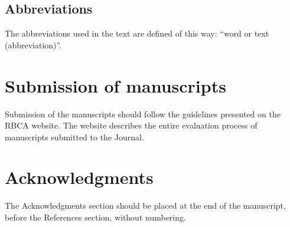 \documentclass[alpha-refs,brazilian]{RBCA_v3.0}
\begin{document}
\subsection{Abbreviations}
The abbreviations used in the text are defined of this way: ``word or text (abbreviation)''.


\section{Submission of manuscripts}
Submission of the manuscripts should follow the guidelines presented on the RBCA website. The website describes the entire evaluation process of manuscripts submitted to the Journal.

\section*{Acknowledgments}

The Acknowledgments section should be placed at the end of the manuscript, before the References section, without numbering.

 
\end{document}
